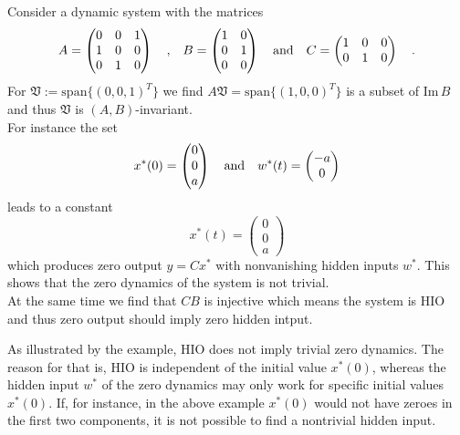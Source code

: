 \begin{example}{}{}
	Consider a dynamic system with the matrices
	\begin{equation}
	A = \begin{pmatrix}
	0 & 0 & 1 \\ 1 & 0 & 0 \\ 0 & 1 & 0
	\end{pmatrix}		 \quad \text{,} \quad
	B = \begin{pmatrix}
	1 & 0 \\ 0 & 1 \\ 0 & 0
	\end{pmatrix}
	\quad \text{and} \quad C =
	\begin{pmatrix}
	1 & 0 & 0 \\ 0 & 1 & 0
	\end{pmatrix} \quad .
	\end{equation}
	For $\mathfrak{V} := \text{span}\{(0,0,1)^T\}$ we find  
	$A\mathfrak{V}=\text{span}\{(1,0,0)^T\}$ is a subset of 
	$\text{Im}\, B$ and thus $\mathfrak{V}$ is $(A,B)$-invariant. \\
	For instance the set
	\begin{equation}
	x^*(0) = \begin{pmatrix}
	0 \\ 0 \\ a
	\end{pmatrix}
	\quad \text{and} \quad
	w^*(t) = \begin{pmatrix}
	- a \\
	0
	\end{pmatrix}
	\end{equation}
	leads to a constant
	\begin{equation}
	x^*(t) = \begin{pmatrix}
	0 \\ 0 \\ a
	\end{pmatrix}
	\end{equation}
	which produces zero output $y=Cx^*$ with nonvanishing hidden inputs 
	$w^*$. This 
	shows that the zero dynamics of the system is not trivial. \\
	At the same time we find that $CB$ is injective which means the 
	system is HIO and thus zero output should imply zero hidden intput.
\end{example}

As illustrated by the example, HIO does not imply trivial zero dynamics. 
The reason for that is, HIO is independent of the initial value 
$x^*(0)$, whereas the hidden input $w^*$ of the zero dynamics may only 
work for specific initial values $x^*(0)$. If, for instance, in the above 
example $x^*(0)$ would not have zeroes in the first two components, 
it is not possible to find a nontrivial hidden input.

